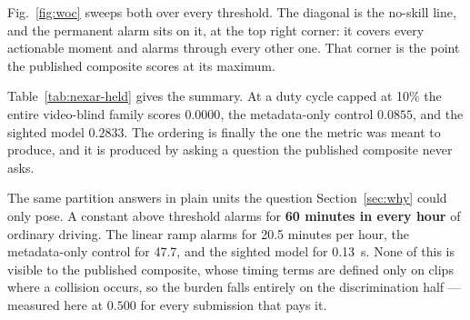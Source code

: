 Fig.~\ref{fig:woc} sweeps both over every threshold. The diagonal is the
no-skill line, and the permanent alarm sits on it, at the top right corner: it
covers every actionable moment and alarms through every other one. That corner
is the point the published composite scores at its maximum.

Table~\ref{tab:nexar-held} gives the summary. At a duty cycle capped at 10\%
the entire video-blind family scores $0.0000$, the metadata-only control
$0.0855$, and the sighted model $0.2833$. The ordering is finally the one the
metric was meant to produce, and it is produced by asking a question the
published composite never asks.

The same partition answers in plain units the question Section~\ref{sec:why}
could only pose. A constant above threshold alarms for \textbf{60 minutes in
every hour} of ordinary driving. The linear ramp alarms for 20.5 minutes per
hour, the metadata-only control for 47.7, and the sighted model for
\SI{0.13}{\second}. None of this is visible to the published composite, whose
timing terms are defined only on clips where a collision occurs, so the burden
falls entirely on the discrimination half --- measured here at $0.500$ for
every submission that pays it.
